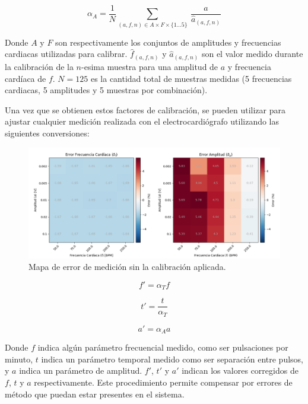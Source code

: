 \documentclass[conference]{IEEEtran}
\begin{document}
\begin{equation}
\alpha_{A} = \dfrac{1}{N} \sum_{(a,f,n) \in A \times F \times \{1...5 \}}
\nolimits ~ \frac{a}{\hat{a}_{(a,f,n)}}
\label{eqn:alpha_a}
\end{equation}



Donde $A$ y $F$ son respectivamente los conjuntos de amplitudes y frecuencias
cardiacas utilizadas para calibrar. $\hat{f}_{(a,f,n)}$ y $\hat{a}_{(a,f,n)}$
son el valor medido durante la calibración de la $n$-esima muestra para una
amplitud de $a$ y frecuencia cardíaca de $f$. $N=125$ es la cantidad total de
muestras medidas (5 frecuencias cardiacas, 5 amplitudes y 5 muestras por
combinación).

Una vez que se obtienen estos factores de calibración, se pueden utilizar para
ajustar cualquier medición realizada con el electrocardiógrafo utilizando las
siguientes conversiones:

\begin{figure}[t]
    \centering
    \includegraphics[width=\textwidth]{figs/calib_error_map.png}
    \caption{Mapa de error de medición sin la calibración aplicada.}
    \label{fig:plot_errpr_sin_calib}
\end{figure}



\begin{equation}
    f' = \alpha_{T} f
    \label{eqn:f_correct}
\end{equation} 

\begin{equation}
    t' = \frac{t}{\alpha_{T}}
    \label{eqn:t_correct}
\end{equation} 

\begin{equation}
    a' = \alpha_{A} a
    \label{eqn:a_correct}
\end{equation} 
        
Donde $f$ indica algún parámetro frecuencial medido, como ser pulsaciones por
minuto, $t$ indica un parámetro temporal medido como ser separación entre
pulsos, y $a$ indica un parámetro de amplitud. $f'$, $t'$ y $a'$ indican los
valores corregidos de $f$, $t$ y $a$ respectivamente.
Este procedimiento permite compensar por errores de método que puedan estar
presentes en el sistema.
\end{document}
